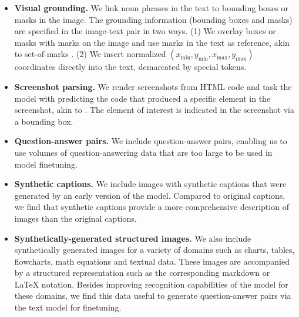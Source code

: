 \begin{itemize}

\item \textbf{Visual grounding.}
We link noun phrases in the text to bounding boxes or masks in the image.
The grounding information (bounding boxes and masks) are specified in the image-text pair in two ways. (1) We overlay boxes or masks with marks on the image and use marks in the text as reference, akin to set-of-marks \citep{yang2023set}. (2) We insert normalized $(x_\textrm{min}, y_\textrm{min}, x_\textrm{max}, y_\textrm{max})$ coordinates directly into the text, demarcated by special tokens.

\item \textbf{Screenshot parsing.} We render screenshots from HTML code and task the model with predicting the code that produced a specific element in the screenshot, akin to \citet{Pix2Struct}. The element of interest is indicated in the screenshot via a bounding box.

\item \textbf{Question-answer pairs.} We include question-answer pairs, enabling us to use volumes of question-answering data that are too large to be used in model finetuning.

\item \textbf{Synthetic captions.} We include images with synthetic captions that were generated by an early version of the model. Compared to original captions, we find that synthetic captions provide a more comprehensive description of images than the original captions.

\item \textbf{Synthetically-generated structured images.} We also include synthetically generated images for a variety of domains such as charts, tables, flowcharts, math equations and textual data. These images are accompanied by a structured representation such as the corresponding markdown or LaTeX notation. Besides improving recognition capabilities of the model for these domains, we find this data useful to generate question-answer pairs via the text model for finetuning.
\end{itemize}


